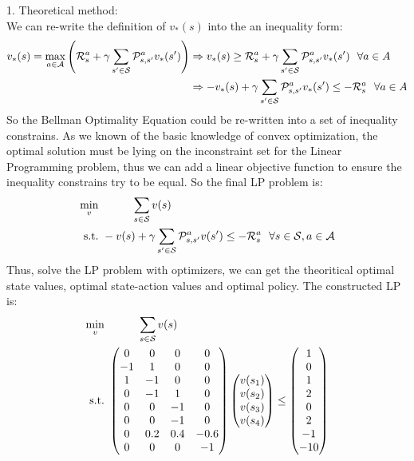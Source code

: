 \begin{homeworkProblem}
1. Theoretical method: \\
We can re-write the definition of $v_*(s)$ into the an inequality form:
\begin{align*}
v_*(s) = \max_{a \in \mathcal{A}}\left(\mathcal{R}_s^a + \gamma \sum_{s' \in \mathcal{S}} \mathcal{P}_{s,s'}^a v_*(s')\right)
&\Rightarrow v_*(s) \geq \mathcal{R}_s^a + \gamma \sum_{s' \in \mathcal{S}} \mathcal{P}_{s,s'}^a v_*(s')\ \ \forall a\in A \\
&\Rightarrow -v_*(s) + \gamma \sum_{s' \in \mathcal{S}} \mathcal{P}_{s,s'}^a v_*(s') \leq -\mathcal{R}_s^a\ \ \forall a\in A
\end{align*}
So the Bellman Optimality Equation could be re-written into a set of inequality constrains. As we known of the basic knowledge of convex optimization, the optimal solution must be lying on the inconstraint set for the Linear Programming problem, thus we can add a linear objective function to ensure the inequality constrains try to be equal. So the final LP problem is:
\begin{align*}
\min_{v} &\qquad\quad \sum_{s \in \mathcal{S}} v(s) \\
\text{s.t.} &\ -v(s) + \gamma \sum_{s' \in \mathcal{S}} \mathcal{P}_{s,s'}^a v(s') \leq -\mathcal{R}_s^a\ \ \forall s\in\mathcal{S}, a\in \mathcal{A}
\end{align*}
Thus, solve the LP problem with optimizers, we can get the theoritical optimal state values, optimal state-action values and optimal policy. The constructed LP is:
\begin{align*}
\min_{v} &\qquad\quad \sum_{s \in \mathcal{S}} v(s) \\
\text{s.t.} &\ \begin{pmatrix}
0 & 0 & 0 & 0 \\
-1 & 1 & 0 & 0 \\
1 & -1 & 0 & 0 \\
0 & -1 & 1 & 0 \\
0 & 0 & -1 & 0 \\
0 & 0 & -1 & 0 \\
0 & 0.2 & 0.4 & -0.6 \\
0 & 0 & 0 & -1
\end{pmatrix}
\begin{pmatrix}
v(s_1) \\ v(s_2) \\ v(s_3) \\ v(s_4)
\end{pmatrix} \leq \begin{pmatrix}
1 \\ 0 \\ 1 \\ 2 \\ 0 \\ 2 \\ -1 \\ -10

\end{pmatrix}
\end{align*}
\end{homeworkProblem}

